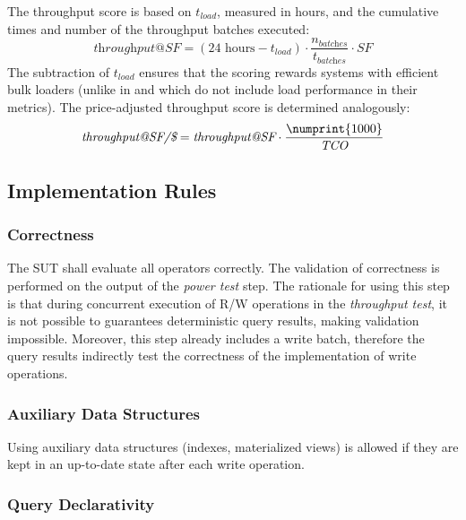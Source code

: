 The throughput score is based on $t_\textit{load}$, measured in hours,
and the cumulative times and number of the throughput batches executed:
$$
\textit{throughput@SF} =
    (24\text{ hours} - t_\textit{load})
    \cdot
    \frac{n_\textit{batches}}{t_\textit{batches}}
    \cdot
    \textit{SF}
$$
The subtraction of $t_\textit{load}$ ensures that the scoring rewards systems with efficient bulk loaders (unlike in \tpcH and \tpcDS which do not include load performance in their metrics).
The price-adjusted throughput score is determined analogously: %
$$ \textit{throughput@SF/\$} = \textit{throughput@SF} \cdot \frac{\numprint{1000}}{\textit{TCO}} $$

\subsection{Implementation Rules}
\label{sec:bi-implementation-rules}

\subsubsection{Correctness}
\label{sec:bi-correcntess}

The SUT shall evaluate all operators correctly.
The validation of correctness is performed on the output of the \emph{power test} step.
The rationale for using this step is that during concurrent execution of R/W operations in the \emph{throughput test}, it is not possible to guarantees deterministic query results, making validation impossible. Moreover, this step already includes a write batch, therefore the query results indirectly test the correctness of the implementation of write operations.

\subsubsection{Auxiliary Data Structures}
\label{sec:bi-auxiliary-data-structures}

Using auxiliary data structures (\eg indexes, materialized views) is allowed if they are kept in an up-to-date state after each write operation.

\subsubsection{Query Declarativity}
\label{sec:bi-query-declarativity}


